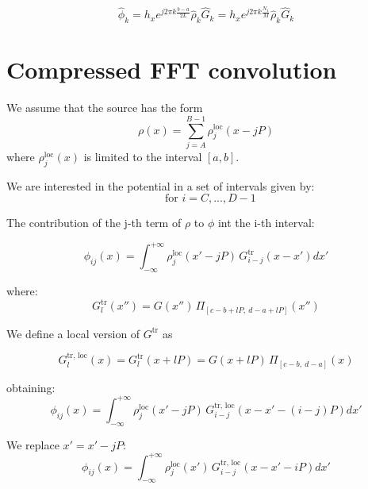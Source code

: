 \begin{equation}
\hat{\phi}_k  = 
h_x e^{j2\pi k \frac{b-a}{2L}} 
\hat{\rho}_k \hat{G}_k
=
h_x e^{j2\pi k \frac{N_1}{M}} 
\hat{\rho}_k \hat{G}_k
\end{equation}

\section{Compressed FFT convolution}

We assume that the source has the form
\begin{equation}
\rho(x) =  \sum_{j=A}^{B-1} \rho^\text{loc}_j(x - jP)
\label{eq:rholim_period}
\end{equation}
where $\rho^\text{loc}_j(x)$ is limited to the interval $[a, b]$.

We are interested in the potential in a set of intervals given by:
\begin{equation}
[c+iP,~d+iP]~~\text{ for } i=C, ... , D-1
\end{equation}

The contribution of the j-th term of $\rho$ to  $\phi$ int the i-th interval:

\begin{equation}
\phi_{ij}(x) = 
\int_{-\infty}^{+\infty} 
\rho^\text{loc}_j(x' - jP)\,G^\text{tr}_{i-j}(x-x') dx'
\end{equation}

where:
\begin{equation}
G^\text{tr}_l(x'') = G(x'')\,
\Pi_{[c-b+lP,~d-a+lP]}
\left(
{x''}
\right)
\end{equation}

We define a local version of $G^\text{tr}$ as

\begin{equation}
G^\text{tr, loc}_l(x) = G^\text{tr}_l(x + lP) 
=
G(x +lP)\,
\Pi_{[c-b,~d-a]}
\left(x\right)
\end{equation}

obtaining:
\begin{equation}
\phi_{ij}(x) = 
\int_{-\infty}^{+\infty} 
\rho^\text{loc}_j(x' - jP)\,G^\text{tr, loc}_{i-j}(x-x'-(i-j)P) dx'
\end{equation}

We replace $x' = x' - jP$:
\begin{equation}
\phi_{ij}(x) = 
\int_{-\infty}^{+\infty} 
\rho^\text{loc}_j(x')\,G^\text{tr, loc}_{i-j}(x-x' - iP) dx'
\end{equation}

